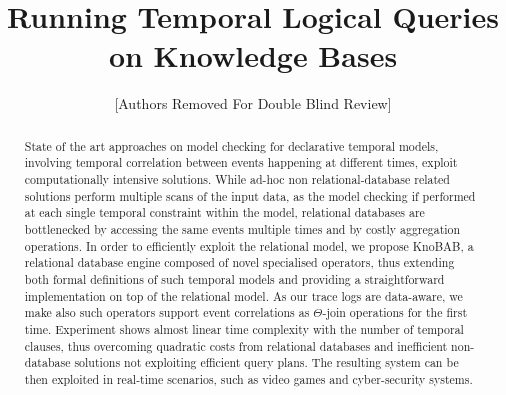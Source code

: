 \documentclass[11pt]{article}
\begin{document}
\title{Running Temporal Logical Queries on Knowledge Bases}

\author{[Authors Removed For Double Blind Review]}

\maketitle
~\\
\begin{abstract}
	
State of the art approaches on model checking for declarative temporal models, involving temporal correlation between events happening at different times, exploit computationally intensive solutions. While ad-hoc non relational-database related solutions perform multiple scans of the input data, as the model checking if performed at each single temporal constraint within the model, relational databases are bottlenecked by accessing the same events multiple times and by costly aggregation operations. In order to efficiently exploit the relational model, we propose KnoBAB, a relational database engine composed of novel specialised operators, thus extending both formal definitions of such temporal models and providing a straightforward implementation on top of the relational model. As our trace logs are data-aware, we make also such operators support event correlations as $\Theta$-join operations for the first time. Experiment shows almost linear time complexity with the number of temporal clauses, thus overcoming quadratic costs from relational databases and inefficient non-database solutions not exploiting efficient query plans. The resulting system can be then exploited in real-time scenarios, such as video games and cyber-security systems.


\end{abstract}
\end{document}
